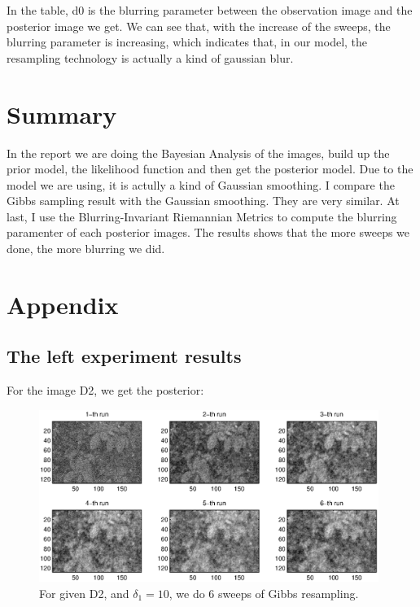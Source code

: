 \documentclass[11pt] {article}
\begin{document}
In the table, d0 is the blurring parameter between the observation image and the posterior image we get. We can see that, with the increase of the sweeps, the blurring parameter is increasing, which indicates that, in our model, the resampling technology is actually a kind of gaussian blur. 

\section{Summary}

In the report we are doing the Bayesian Analysis of the images, build up the prior model, the likelihood function and then get the posterior model. Due to the model we are using, it is actully a kind of 
Gaussian smoothing. I compare the Gibbs sampling result with the Gaussian smoothing. They are very similar. At last, I use the Blurring-Invariant Riemannian Metrics to compute the blurring paramenter of each posterior images. The results shows that the more sweeps we done, the more blurring we did. 


\section{Appendix}

\subsection{The left experiment results}

For the image D2, we get the posterior:



\begin{figure}
\begin{center}

\includegraphics[height=2.2in]{D2_d1.eps}

\end{center}
\caption{For given D2, and $\delta_1=10$, we do 6 sweeps of Gibbs resampling.}
\label{fig:D2_d1}
\end{figure}
\end{document}
